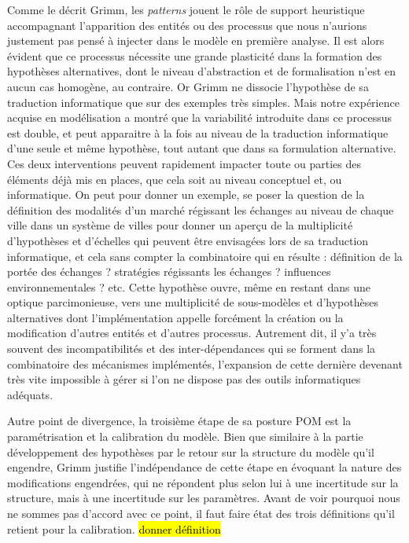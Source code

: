 Comme le décrit Grimm, les \textit{patterns} jouent le rôle de support heuristique accompagnant l'apparition des entités ou des processus que nous n'aurions justement pas pensé à injecter dans le modèle en première analyse. Il est alors évident que ce processus nécessite une grande plasticité dans la formation des hypothèses alternatives, dont le niveau d'abstraction et de formalisation n'est en aucun cas homogène, au contraire. Or Grimm ne dissocie l'hypothèse de sa traduction informatique que sur des exemples très simples. Mais notre expérience acquise en modélisation a montré que la variabilité introduite dans ce processus est double, et peut apparaitre à la fois au niveau de la traduction informatique d'une seule et même hypothèse, tout autant que dans sa formulation alternative. Ces deux interventions peuvent rapidement impacter toute ou parties des éléments déjà mis en places, que cela soit au niveau conceptuel et, ou informatique. On peut pour donner un exemple, se poser la question de la définition des modalités d'un marché régissant les échanges au niveau de chaque ville dans un système de villes pour donner un aperçu de la multiplicité d'hypothèses et d'échelles qui peuvent être envisagées lors de sa traduction informatique, et cela sans compter la combinatoire qui en résulte : définition de la portée des échanges ? stratégies régissants les échanges ? influences environnementales ? etc. Cette hypothèse ouvre, même en restant dans une optique parcimonieuse, vers une multiplicité de sous-modèles et d'hypothèses alternatives dont l'implémentation appelle forcément la création ou la modification d'autres entités et d'autres processus. Autrement dit, il y'a très souvent des incompatibilités et des inter-dépendances qui se forment dans la combinatoire des mécanismes implémentés, l'expansion de cette dernière devenant très vite impossible à gérer si l'on ne dispose pas des outils informatiques adéquats.

Autre point de divergence, la troisième étape de sa posture POM est la paramétrisation et la calibration du modèle. Bien que similaire à la partie développement des hypothèses par le retour sur la structure du modèle qu'il engendre, Grimm justifie l'indépendance de cette étape en évoquant la nature des modifications engendrées, qui ne répondent plus selon lui à une incertitude sur la structure, mais à une incertitude sur les paramètres. Avant de voir pourquoi nous ne sommes pas d'accord avec ce point, il faut faire état des trois définitions qu'il retient pour la calibration. \hl{donner définition}

